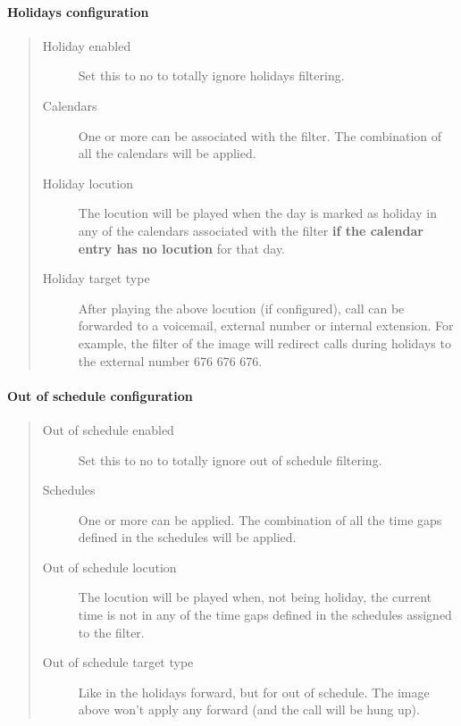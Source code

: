 \documentclass[letterpaper,10pt,spanish]{sphinxmanual}
\begin{document}
\paragraph{Holidays configuration}
\label{administration_portal/client/vpbx/routing_tools/external_call_filters:holidays-configuration}\begin{quote}
\begin{description}
\item[{Holiday enabled}] \leavevmode
Set this to no to totally ignore holidays filtering.

\item[{Calendars}] \leavevmode
One or more {\hyperref[administration_portal/client/vpbx/routing_tools/calendars:calendars]{}} can be associated with the filter. The combination
of all the calendars will be applied.

\item[{Holiday locution}] \leavevmode
The locution will be  played when the day is marked as holiday in any
of the calendars associated with the filter \textbf{if the calendar entry has
no locution} for that day.

\item[{Holiday target type}] \leavevmode
After playing the above locution (if configured), call can be forwarded
to a voicemail, external number or internal extension. For example, the
filter of the image will redirect calls during holidays to the external
number 676 676 676.

\end{description}
\end{quote}


\paragraph{Out of schedule configuration}
\label{administration_portal/client/vpbx/routing_tools/external_call_filters:out-of-schedule-configuration}\begin{quote}
\begin{description}
\item[{Out of schedule enabled}] \leavevmode
Set this to no to totally ignore out of schedule filtering.

\item[{Schedules}] \leavevmode
One or more {\hyperref[administration_portal/client/vpbx/routing_tools/schedules:schedules]{}} can be applied. The combination of all the time
gaps defined in the schedules will be applied.

\item[{Out of schedule locution}] \leavevmode
The locution will be played when, not being holiday, the current time
is not in any of the time gaps defined in the schedules assigned to the
filter.

\item[{Out of schedule target type}] \leavevmode
Like in the holidays forward, but for out of schedule. The image above
won't apply any forward (and the call will be hung up).

\end{description}
\end{quote}
\end{document}
